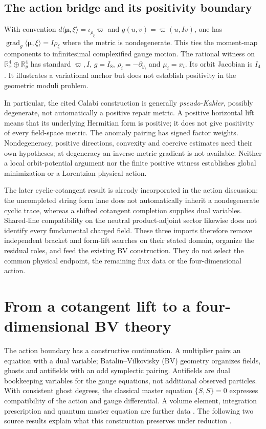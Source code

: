 \documentclass[11pt,a4paper]{article}
\begin{document}
\subsection{The action bridge and its positivity boundary}
\label{sec:string-positivity}

With convention \(d\langle\boldsymbol\mu,\xi\rangle
=\iota_{\rho_\xi}\varpi\) and \(g(u,v)=\varpi(u,Iv)\), one has
\(\operatorname{grad}_g\langle\boldsymbol\mu,\xi\rangle=I\rho_\xi\)
where the metric is nondegenerate. This ties the moment-map components to
infinitesimal complexified gauge motion. The rational witness on
\(\mathbb R^4_x\oplus\mathbb R^4_y\) has standard \(\varpi,I\),
\(g=I_8\), \(\rho_i=-\partial_{y_i}\) and \(\mu_i=x_i\).
Its orbit Jacobian is \(I_4\). It illustrates a variational anchor but
does not establish positivity in the geometric moduli problem.

In particular, the cited Calabi construction is generally
\emph{pseudo-Kahler}, possibly degenerate, not automatically a positive
repair metric. A positive horizontal lift means that its underlying
Hermitian form is positive; it does not give positivity of every field-space
metric. The anomaly pairing has signed factor weights. Nondegeneracy,
positive directions, convexity and coercive estimates need their own
hypotheses; at degeneracy an inverse-metric gradient is not available.
Neither a local orbit-potential argument nor the finite positive witness
establishes global minimization or a Lorentzian physical action.

The later cyclic-cotangent result is already incorporated in the action
discussion: the uncompleted string form lane does not automatically inherit
a nondegenerate cyclic trace, whereas a shifted cotangent completion supplies
dual variables. Shared-line compatibility on the neutral product-adjoint
sector likewise does not identify every fundamental charged field.
These three imports therefore remove independent bracket and form-lift
searches on their stated domain, organize the residual roles, and feed the
existing BV construction. They do not select the common physical endpoint,
the remaining flux data or the four-dimensional action.

\section{From a cotangent lift to a four-dimensional BV theory}
\label{sec:bv-reduction}

The action boundary has a constructive continuation. A multiplier pairs an
equation with a dual variable; Batalin--Vilkovisky (BV) geometry organizes
fields, ghosts and antifields with an odd symplectic pairing. Antifields are
dual bookkeeping variables for the gauge equations, not additional observed
particles. With consistent ghost degrees, the classical master equation
\(\{S,S\}=0\) expresses compatibility of the action and gauge differential.
A volume element, integration prescription and quantum master equation are
further data \cite{SchwarzBV1992}. The following two source results explain
what this construction preserves under reduction
\cite{PreprojectionCotangentReduction2026,PreprojectionOrientationBV2026}.
\end{document}
